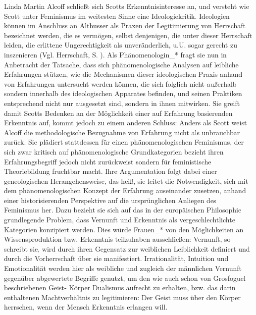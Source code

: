 Linda Martin Alcoff schließt sich Scotts Erkenntnisinteresse an, und versteht
wie Scott unter Feminismus im weitesten Sinne eine Ideologiekritik. Ideologien
können im Anschluss an Althusser als Praxen der Legitimierung von Herrschaft
bezeichnet werden, die es vermögen, selbst denjenigen, die unter dieser
Herrschaft leiden, die erlittene Ungerechtigkeit als unveränderlich, u.U. sogar
gerecht zu inszenieren (Vgl. Herrschaft, S. ). Als Phänomenologin\_* fragt sie
nun in Anbetracht der Tatsache, dass sich phänomenologische Analysen auf
leibliche Erfahrungen stützen, wie die Mechanismen dieser ideologischen Praxis
anhand von Erfahrungen untersucht werden können, die sich folglich nicht
außerhalb sondern innerhalb des ideologischen Apparates befinden, und seinen
Praktiken entsprechend nicht nur ausgesetzt sind, sondern in ihnen mitwirken.
Sie greift damit Scotts Bedenken an der Möglichkeit einer auf Erfahrung
basierenden Erkenntnis auf, kommt jedoch zu einem anderen Schluss: Anders als
Scott weist Alcoff die methodologische Bezugnahme von Erfahrung nicht als
unbrauchbar zurück. Sie plädiert stattdessen für einen phänomenologischen
Feminismus, der sich zwar kritisch auf phänomenologische Grundkategorien
bezieht ihren Erfahrungsbegriff jedoch nicht zurückweist sondern für
feministische Theoriebildung fruchtbar macht.  Ihre Argumentation folgt dabei
einer geneologischen Herangehensweise, das heiß, sie leitet die Notwendigkeit,
sich mit dem phänomenologischen Konzept der Erfahrung auseinander zusetzen,
anhand einer historisierenden Perspektive auf die ursprünglichen Anliegen des
Feminismus her.  Dazu bezieht sie sich auf das in der europäischen Philosophie
grundlegende Problem, dass Vernunft und Erkenntnis als vergeschlechtlichte
Kategorien konzipiert werden. Dies würde Frauen\_* von den Möglichkeiten an
Wissensproduktion bzw. Erkenntnis teilzuhaben ausschließen: Vernunft, so
schreibt sie, wird durch ihren Gegensatz zur weiblichen Leiblichkeit definiert
und durch die Vorherrschaft über sie manifestiert. \footnotemark
{} Irrationalität, Intuition und
Emotionalität werden hier als weibliche und zugleich der männlichen Vernunft
gegenüber abgewertete Begriffe genutzt, um den wie auch schon von Grosfoguel
beschriebenen Geist- Körper Dualismus aufrecht zu erhalten, bzw. das darin
enthaltenen Machtverhältnis zu legitimieren: Der Geist muss über den Körper
herrschen, \glqq wenn der Mensch Erkenntnis erlangen will.\grqq \footnotemark
{}

